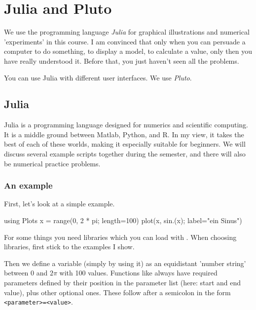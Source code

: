 \renewcommand{\lastmod}{September 24, 2021}
\renewcommand{\chapterauthors}{Markus Lippitz}




\chapter{Julia and Pluto}


We use the programming language \emph{Julia} for graphical illustrations and numerical 'experiments' in this course. I am convinced that only when you can persuade a computer to do something, to display a model, to calculate a value, only then you have really understood it. Before that, you just haven't seen all the problems.  

You can use Julia with different user interfaces. We use \emph{Pluto}.

\section{Julia}

Julia is a programming language designed for numerics and scientific computing. It is a middle ground between Matlab, Python, and R. In my view, it takes the best of each of these worlds, making it especially suitable for beginners. We will discuss several example scripts together during the semester, and there will also be numerical practice problems.


\subsection{An example}

First, let's look at a simple example.


\begin{jllisting}
using Plots
x = range(0, 2 * pi; length=100)
plot(x, sin.(x); label="ein Sinus")
\end{jllisting}

For some things you need libraries which you can load with . When choosing libraries, first stick to the examples I show.

Then we define a variable  (simply by using it) as an equidistant 'number string' between 0 and $2 \pi$ with 100 values. Functions like  always have required parameters defined by their position in the parameter list (here: start and end value), plus other optional ones. These follow after a semicolon in the form \texttt{<parameter>=<value>}.

